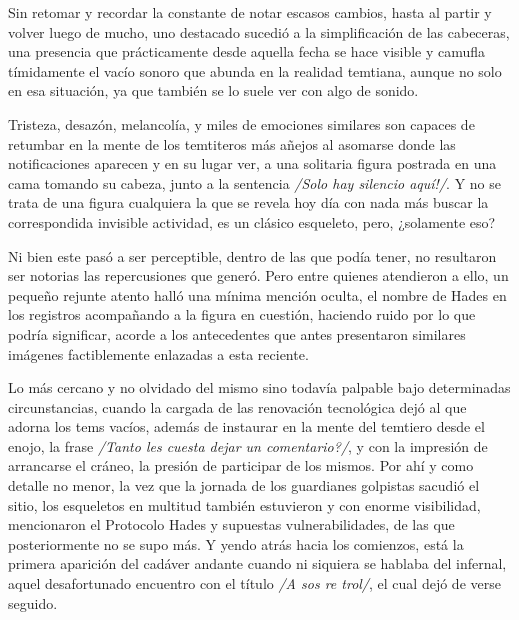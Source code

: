 \documentclass[
]{book}
\begin{document}
Sin retomar y recordar la constante de notar escasos cambios, hasta al partir y volver luego de mucho, uno destacado sucedió a la simplificación de las cabeceras, una presencia que prácticamente desde aquella fecha se hace visible y camufla tímidamente el vacío sonoro que abunda en la realidad temtiana, aunque no solo en esa situación, ya que también se lo suele ver con algo de sonido.

Tristeza, desazón, melancolía, y miles de emociones similares son capaces de retumbar en la mente de los temtiteros más añejos al asomarse donde las notificaciones aparecen y en su lugar ver, a una solitaria figura postrada en una cama tomando su cabeza, junto a la sentencia \emph{/Solo hay silencio aquí!/}. Y no se trata de una figura cualquiera la que se revela hoy día con nada más buscar la correspondida invisible actividad, es un clásico esqueleto, pero, ¿solamente eso?

Ni bien este pasó a ser perceptible, dentro de las que podía tener, no resultaron ser notorias las repercusiones que generó. Pero entre quienes atendieron a ello, un pequeño rejunte atento halló una mínima mención oculta, el nombre de Hades en los registros acompañando a la figura en cuestión, haciendo ruido por lo que podría significar, acorde a los antecedentes que antes presentaron similares imágenes factiblemente enlazadas a esta reciente.

Lo más cercano y no olvidado del mismo sino todavía palpable bajo determinadas circunstancias, cuando la cargada de las renovación tecnológica dejó al que adorna los tems vacíos, además de instaurar en la mente del temtiero desde el enojo, la frase \emph{/Tanto les cuesta dejar un comentario?/}, y con la impresión de arrancarse el cráneo, la presión de participar de los mismos. Por ahí y como detalle no menor, la vez que la jornada de los guardianes golpistas sacudió el sitio, los esqueletos en multitud también estuvieron y con enorme visibilidad, mencionaron el Protocolo Hades y supuestas vulnerabilidades, de las que posteriormente no se supo más. Y yendo atrás hacia los comienzos, está la primera aparición del cadáver andante cuando ni siquiera se hablaba del infernal, aquel desafortunado encuentro con el título \emph{/A sos re trol/}, el cual dejó de verse seguido.
\end{document}

